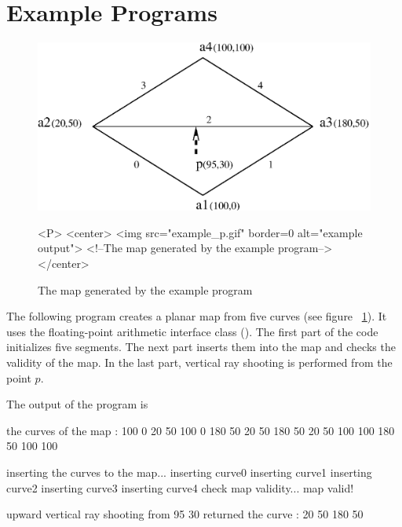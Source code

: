 \section{Example Programs}
\label{PM_sec:example}


\begin{figure}[h]
\begin{ccTexOnly}
    \centerline{
      \includegraphics{example_p.ps}
    }
\end{ccTexOnly}

\caption{The map generated by the example program
\label{PM_sec:example_pic}}

\begin{ccHtmlOnly}
    <P>
    <center>
        <img src="example_p.gif"  border=0 alt="example output">
        <!--The map generated by the example program-->
    </center>
\end{ccHtmlOnly}
\end{figure}

The following program creates a planar map from five curves (see
figure ~\ref{PM_sec:example_pic}). It uses the floating-point
arithmetic interface class
(). The first part of the
code initializes five segments. The next part inserts them into the map
and checks the validity of the map. In the last part, vertical ray
shooting is performed from the point $p$.


The output of the program is

\begin{ccExampleCode}
the curves of the map :
100 0 20 50
100 0 180 50
20 50 180 50
20 50 100 100
180 50 100 100

inserting the curves to the map...
inserting curve0
inserting curve1
inserting curve2
inserting curve3
inserting curve4
check map validity... map valid!

upward vertical ray shooting from 95 30
returned the curve : 20 50 180 50

\end{ccExampleCode}

